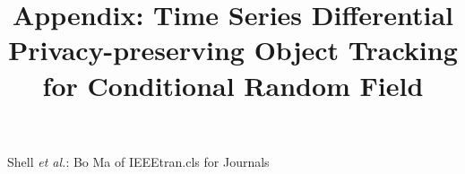 \documentclass[journal,transmag]{IEEEtran}
\begin{document}
%
\title{Appendix: Time Series Differential Privacy-preserving Object Tracking for Conditional Random Field }

%
{Shell \MakeLowercase{\textit{et al.}}: Bo Ma of IEEEtran.cls for Journals}
%







\end{document}
